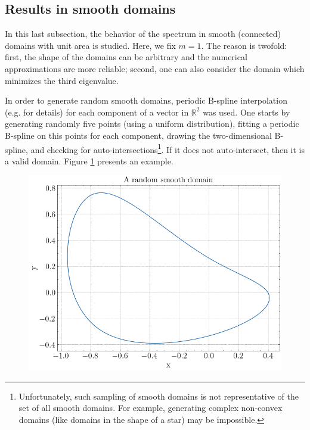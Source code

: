 \subsection{Results in smooth domains}\label{numerics_smooth_section}

In this last subsection, the behavior of the spectrum in smooth (connected) domains with unit area is studied. Here, we fix \(m=1\). The reason is twofold: first, the shape of the domains can be arbitrary and the numerical approximations are more reliable; second, one can also consider the domain which minimizes the third eigenvalue.

In order to generate random smooth domains, periodic B-spline interpolation (e.g. \cite{de1978practical} for details) for each component of a vector in \(\mathbb{R}^2\) was used. One starts by generating randomly five points (using a uniform distribution), fitting a periodic B-spline on this points for each component, drawing the two-dimensional B-spline, and checking for auto-intersections\footnote{Unfortunately, such sampling of smooth domains is not representative of the set of all smooth domains. For example, generating complex non-convex domains (like domains in the shape of a star) may be impossible.}. If it does not auto-intersect, then it is a valid domain. Figure \ref{dirac_smooth_random_domain} presents an example.

\begin{figure}[!htb]
    \centering
    \includegraphics[width=0.55\linewidth]{Images/Dirac/smooth/random_smooth_domain.png}
    \label{dirac_smooth_random_domain}
\end{figure}

